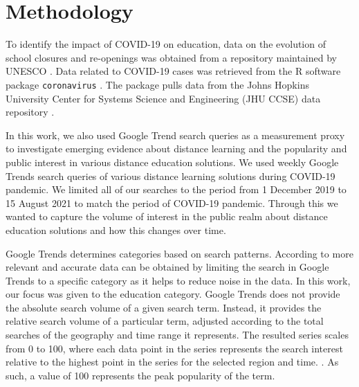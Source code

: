 \documentclass[11pt,a4paper,]{article}
\begin{document}
\hypertarget{methodology}{%
\section{Methodology}\label{methodology}}

To identify the impact of COVID-19 on education, data on the evolution of school closures and re-openings was obtained from a repository maintained by UNESCO \autocite{unesco2020covid}. Data related to COVID-19 cases was retrieved from the R software \autocite{rsoftware} package \texttt{coronavirus} \autocite{coronavirusr}. The package pulls data from the Johns
Hopkins University Center for Systems Science and Engineering (JHU CCSE) data repository \autocite{dong2020interactive}.

In this work, we also used Google Trend search queries as a measurement proxy to investigate emerging evidence about distance learning and the popularity and public interest in various distance education solutions. We used weekly Google Trends search queries of various distance learning solutions during COVID-19 pandemic. We limited all of our searches to the period from 1 December 2019 to 15 August 2021 to match the period of COVID-19 pandemic. Through this we wanted to capture the volume of interest in the public realm about distance education solutions and how this changes over time.

Google Trends determines categories based on search patterns. According to \textcite{vaughan2014web} more relevant and accurate data can be obtained by limiting the search in Google Trends to a specific category as it helps to reduce noise in the data. In this work, our focus was given to the education category. Google Trends does not provide the absolute search volume of a given search term. Instead, it provides the relative search volume of a particular term, adjusted according to the total searches of the geography and time range it represents. The resulted series scales from 0 to 100, where each data point in the series represents the search interest relative to the highest point in the series for the selected region and time. \autocite{alicino2015assessing,vaughan2014web}. As such, a value of 100 represents the peak popularity of the term.
\end{document}
